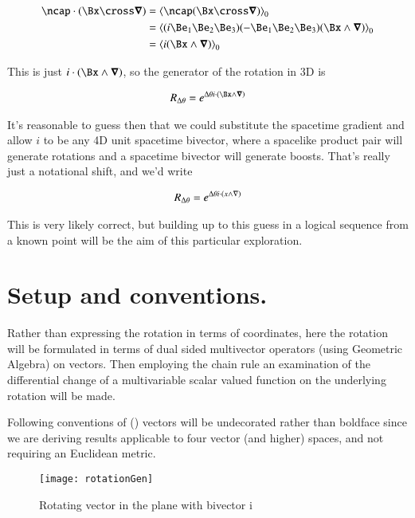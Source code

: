 \begin{align*}
\ncap \cdot (\Bx \cross \spacegrad) 
&=
\gpgradezero{ \ncap (\Bx \cross \spacegrad) } \\
&=
\gpgradezero{ (i \Be_1 \Be_2 \Be_3) (-\Be_1 \Be_2 \Be_3) (\Bx \wedge \spacegrad) } \\
&=
\gpgradezero{ i (\Bx \wedge \spacegrad) } \\
\end{align*}

This is just $i \cdot (\Bx \wedge \spacegrad)$, so the generator of the rotation in 3D is

\begin{align}\label{eqn:rotationGen:goo4}
R_{\Delta\theta} = e^{\Delta\theta i \cdot (\Bx \wedge \spacegrad)}
\end{align}

It's reasonable to guess then that we could substitute the spacetime gradient and allow $i$ to be any 4D unit spacetime bivector, where a spacelike product pair will generate rotations and a spacetime bivector will generate boosts.  That's really just a notational shift, and we'd write

\begin{align}\label{eqn:rotationGen:goo5}
R_{\Delta\theta} = e^{\Delta\theta i \cdot (x \wedge \nabla)}
\end{align}

This is very likely correct, but building up to this guess in a logical sequence from a known point will be the aim of this particular exploration.

\section{Setup and conventions.}

Rather than expressing the rotation in terms of coordinates, here the rotation will be formulated in terms of dual sided multivector operators (using Geometric Algebra) on vectors.  Then employing the chain rule an examination of the differential change of a multivariable scalar valued function on the underlying rotation will be made.

Following conventions of (\citep{doran2003gap}) vectors will be undecorated rather than boldface since we are deriving results applicable to four vector (and higher) spaces, and not requiring an Euclidean metric.

\begin{figure}[htp]
\centering
\texttt{[image: rotationGen]}
\caption{Rotating vector in the plane with bivector i}\label{fig:rotationGen:rotationGen}
\end{figure}

